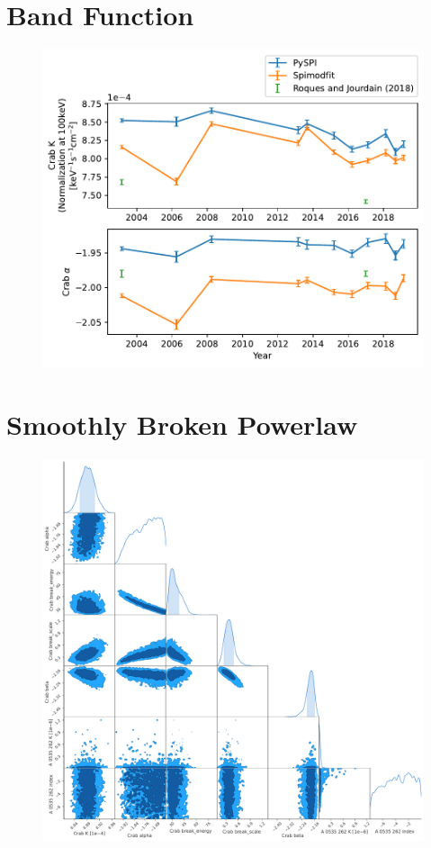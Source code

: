 \documentclass{report}
\begin{document}
\section{Band Function}

\begin{figure}[h]
  \centering
  \includegraphics[width=.75\textwidth]{Images/Crab_Fits/crab_c_band.pdf}
  \caption{}
  \label{}
\end{figure}

\section{Smoothly Broken Powerlaw}
\begin{figure}[h]
  \centering
  \includegraphics[width=\textwidth]{Images/Crab_Fits/0043__sm_br_pl_parameters.pdf}
  \caption{}
  \label{}
\end{figure}
\end{document}
